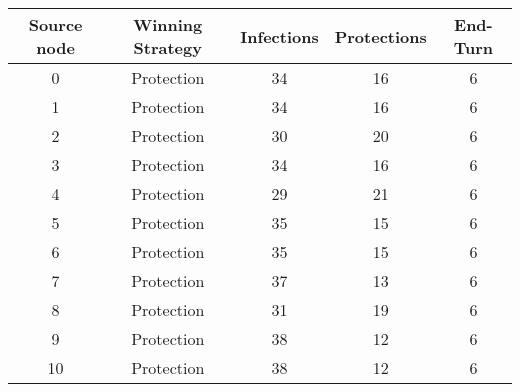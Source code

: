 \documentclass[results.tex]{subfiles}
\begin{document}
    \begin{center}
        \begin{tabular}{| c || c | c | c | c |}
            \hline
            {\bfseries Source node} & {\bfseries Winning Strategy} & {\bfseries Infections} & {\bfseries Protections}
            & {\bfseries End-Turn}
            \\  %
            \hline\hline
            0                       & Protection                   & 34                     & 16                      & 6                    \\
            \hline
            1                       & Protection                   & 34                     & 16                      & 6                    \\
            \hline
            2                       & Protection                   & 30                     & 20                      & 6                    \\
            \hline
            3                       & Protection                   & 34                     & 16                      & 6                    \\
            \hline
            4                       & Protection                   & 29                     & 21                      & 6                    \\
            \hline
            5                       & Protection                   & 35                     & 15                      & 6                    \\
            \hline
            6                       & Protection                   & 35                     & 15                      & 6                    \\
            \hline
            7                       & Protection                   & 37                     & 13                      & 6                    \\
            \hline
            8                       & Protection                   & 31                     & 19                      & 6                    \\
            \hline
            9                       & Protection                   & 38                     & 12                      & 6                    \\
            \hline
            10                      & Protection                   & 38                     & 12                      & 6                    \\

\end{tabular}
\end{center}
\end{document}
